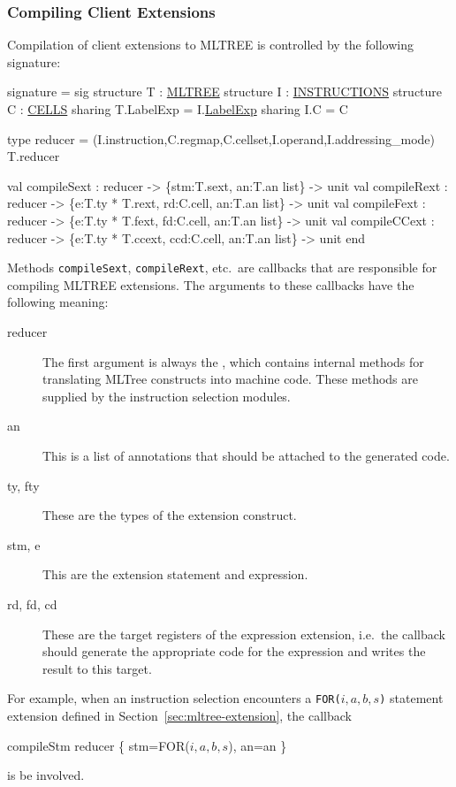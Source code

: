 \subsubsection{Compiling Client Extensions}

Compilation of client extensions to MLTREE is controlled by the
following signature: 
\begin{SML}
signature  =
sig
   structure T : \href{mltree.html}{MLTREE}
   structure I : \href{instructions.html}{INSTRUCTIONS}
   structure C : \href{cells.html}{CELLS}
      sharing T.LabelExp = I.\href{labelexp.html}{LabelExp}
      sharing I.C = C

   type reducer = 
     (I.instruction,C.regmap,C.cellset,I.operand,I.addressing_mode) T.reducer

   val compileSext : reducer -> \{stm:T.sext, an:T.an list\} -> unit
   val compileRext : reducer -> \{e:T.ty * T.rext, rd:C.cell, an:T.an list\} -> unit
   val compileFext : reducer -> \{e:T.ty * T.fext, fd:C.cell, an:T.an list\} -> unit
   val compileCCext : reducer -> \{e:T.ty * T.ccext, ccd:C.cell, an:T.an list\} -> unit
end
\end{SML}

Methods \verb|compileSext|, \verb|compileRext|, etc.~are callbacks that
are responsible for compiling MLTREE extensions.  The arguments
to these callbacks have the following meaning:
\begin{description}
  \item[reducer] The first argument is always the , 
which contains internal methods for translating MLTree constructs
into machine code.  These methods are supplied by the instruction
selection modules.
  \item[an] This is a list of annotations that should be attached to the
generated code.
  \item[ty, fty] These are the types of the extension construct.
  \item[stm, e] This are the extension statement and expression.
  \item[rd, fd, cd] These are the target registers of the 
expression extension, i.e.~the callback should generate the appropriate
code for the expression and writes the result to this target.
\end{description}

For example, when an instruction selection encounters a
\verb|FOR(|$i,a,b,s$\verb|)| statement extension
defined in Section~\ref{sec:mltree-extension}, the callback
\begin{SML}   
  compileStm reducer \{ stm=FOR(\(i,a,b,s\)), an=an \}
\end{SML}
\noindent is be involved. 

